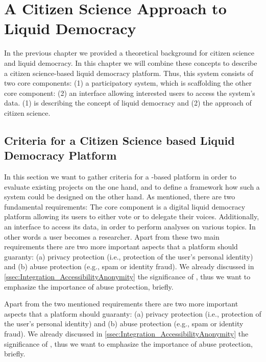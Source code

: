 \chapter{A Citizen Science Approach to Liquid Democracy}
\label{ch:Approach}

In the previous chapter we provided a theoretical background for citizen science and liquid democracy. In this chapter we will combine these concepts to describe a citizen science-based liquid democracy platform. Thus, this system consists of two core components: (1) a participatory system, which is scaffolding the other core component: (2) an interface allowing interested users to access the system’s data. (1) is describing the concept of liquid democracy and (2) the approach of citizen science.

\section{Criteria for a Citizen Science based Liquid Democracy Platform}
\label{sec:Criteria}

In this section we want to gather criteria for a -based  platform in order to evaluate existing projects on the one hand, and to define a framework how such a system could be designed on the other hand. As mentioned, there are two fundamental requirements: The core component is a digital liquid democracy platform allowing its users to either vote or to delegate their voices. Additionally, an interface to access its data, in order to perform analyses on various topics. In other words a user becomes a researcher. Apart from these two main requirements there are two more important aspects that a  platform should guaranty: (a) privacy protection (i.e., protection of the user’s personal identity) and (b) abuse protection (e.g., spam or identity fraud). We already discussed in \autoref{ssec:Integration_AccessibilityAnonymity} the significance of , thus we want to emphasize the importance of abuse protection, briefly.

Apart from the two mentioned requirements there are two more important aspects that a  platform should guaranty: (a) privacy protection (i.e., protection of the user’s personal identity) and (b) abuse protection (e.g., spam or identity fraud). We already discussed in \autoref{ssec:Integration_AccessibilityAnonymity} the significance of , thus we want to emphasize the importance of abuse protection, briefly.

